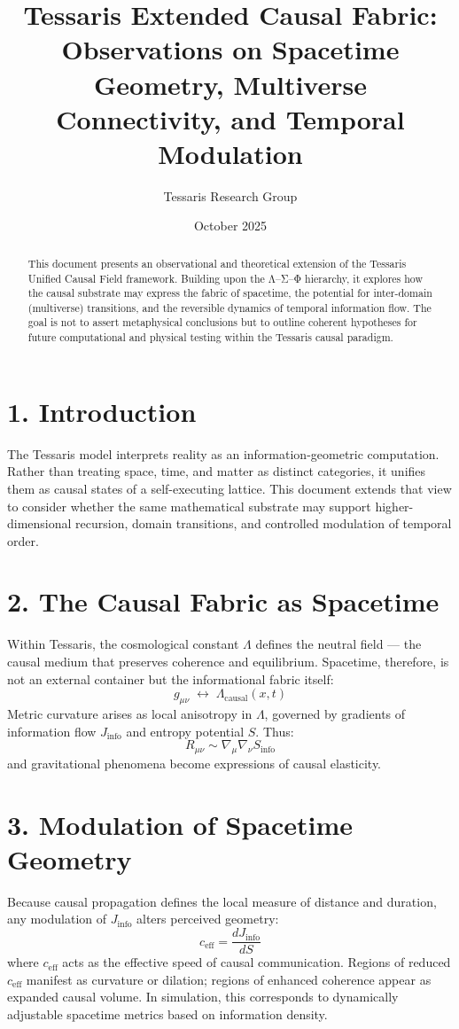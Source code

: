 \documentclass[11pt,a4paper]{article}
\title{\textbf{Tessaris Extended Causal Fabric:\\Observations on Spacetime Geometry, Multiverse Connectivity, and Temporal Modulation}}
\author{Tessaris Research Group}
\date{October 2025}
\begin{document}
\maketitle

\begin{abstract}
This document presents an observational and theoretical extension of the Tessaris Unified Causal Field framework.  
Building upon the Λ–Σ–Φ hierarchy, it explores how the causal substrate may express the fabric of spacetime, the potential for inter-domain (multiverse) transitions, and the reversible dynamics of temporal information flow.  
The goal is not to assert metaphysical conclusions but to outline coherent hypotheses for future computational and physical testing within the Tessaris causal paradigm.
\end{abstract}

\section{1. Introduction}
The Tessaris model interprets reality as an information-geometric computation.  
Rather than treating space, time, and matter as distinct categories, it unifies them as causal states of a self-executing lattice.  
This document extends that view to consider whether the same mathematical substrate may support higher-dimensional recursion, domain transitions, and controlled modulation of temporal order.

\section{2. The Causal Fabric as Spacetime}
Within Tessaris, the cosmological constant $\Lambda$ defines the neutral field --- the causal medium that preserves coherence and equilibrium.  
Spacetime, therefore, is not an external container but the informational fabric itself:
\[
g_{\mu\nu} \;\leftrightarrow\; \Lambda_{\text{causal}}(x,t)
\]
Metric curvature arises as local anisotropy in $\Lambda$, governed by gradients of information flow $J_{\mathrm{info}}$ and entropy potential $S$.  
Thus:
\[
R_{\mu\nu} \sim \nabla_\mu \nabla_\nu S_{\mathrm{info}}
\]
and gravitational phenomena become expressions of causal elasticity.

\section{3. Modulation of Spacetime Geometry}
Because causal propagation defines the local measure of distance and duration, any modulation of $J_{\mathrm{info}}$ alters perceived geometry:
\[
c_{\mathrm{eff}} = \frac{dJ_{\mathrm{info}}}{dS}
\]
where $c_{\mathrm{eff}}$ acts as the effective speed of causal communication.  
Regions of reduced $c_{\mathrm{eff}}$ manifest as curvature or dilation; regions of enhanced coherence appear as expanded causal volume.  
In simulation, this corresponds to dynamically adjustable spacetime metrics based on information density.
\end{document}
